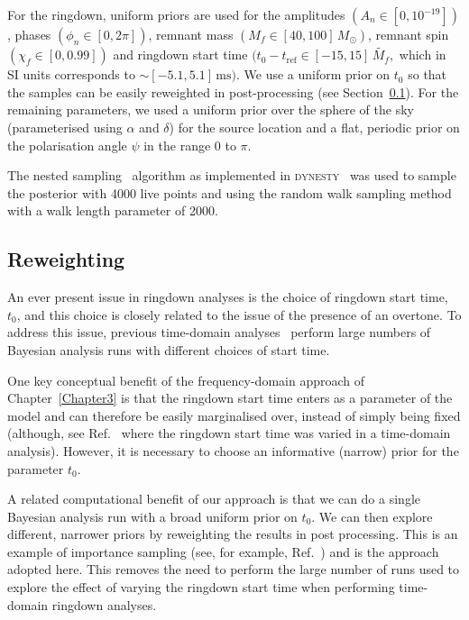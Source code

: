 For the ringdown, uniform priors are used for the amplitudes $(A_n \in [0,10^{-19}])$, phases $(\phi_n \in [0,2\pi])$, remnant mass $(M_f \in [40,100]\,M_\odot )$, remnant spin $(\chi_f \in [0,0.99])$ and ringdown start time $(t_0-t_\mathrm{ref} \in [-15, 15]\,\tilde{M_f},$ which in SI units corresponds to $\sim[-5.1,5.1]\, \mathrm{ms})$.
We use a uniform prior on $t_0$ so that the samples can be easily reweighted in post-processing (see Section~\ref{subsec:reweighting}). 
For the remaining parameters, we used a uniform prior over the sphere of the sky (parameterised using $\alpha$ and $\delta$) for the source location and a flat, periodic prior on the polarisation angle $\psi$ in the range $0$ to $\pi$.

The nested sampling~\cite{Skilling:2006gxv} algorithm as implemented in \textsc{dynesty}~\cite{Speagle:2019ivv} was used to sample the posterior with 4000 live points and using the random walk sampling method with a walk length parameter of 2000.


\subsection{Reweighting} \label{subsec:reweighting}

An ever present issue in ringdown analyses is the choice of ringdown start time, $t_0$, and this choice is closely related to the issue of the presence of an overtone.
To address this issue, previous time-domain analyses~\cite{Isi:2019aib, Cotesta:2022pci, Isi:2022mhy} perform large numbers of Bayesian analysis runs with different choices of start time.

One key conceptual benefit of the frequency-domain approach of Chapter~\ref{Chapter3} is that the ringdown start time enters as a parameter of the model and can therefore be easily marginalised over, instead of simply being fixed (although, see Ref.~\cite{Carullo:2019flw} where the ringdown start time was varied in a time-domain analysis). 
However, it is necessary to choose an informative (narrow) prior for the parameter $t_0$.

A related computational benefit of our approach is that we can do a single Bayesian analysis run with a broad uniform prior on $t_0$. 
We can then explore different, narrower priors by reweighting the results in post processing. 
This is an example of importance sampling (see, for example, Ref.~\cite{RobertChristian2013MCsm}) and is the approach adopted here.
This removes the need to perform the large number of runs used to explore the effect of varying the ringdown start time when performing time-domain ringdown analyses.

